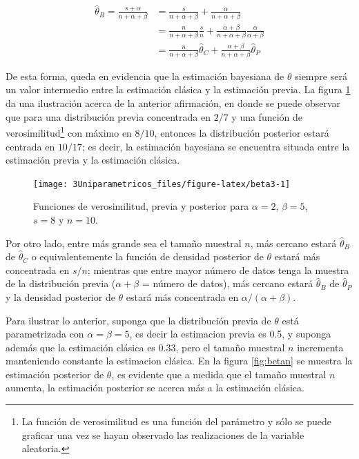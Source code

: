\documentclass[
  10pt,
  spanish,
]{book}
\theoremstyle{definition}
\theoremstyle{definition}
\theoremstyle{definition}
\theoremstyle{definition}
\theoremstyle{remark}
\begin{document}
\begin{align*}
\hat{\theta}_{B}=\frac{s+\alpha}{n+\alpha+\beta}&=\frac{s}{n+\alpha+\beta}+\frac{\alpha}{n+\alpha+\beta}\\
&=\frac{n}{n+\alpha+\beta}\frac{s}{n}+\frac{\alpha+\beta}{n+\alpha+\beta}\frac{\alpha}{\alpha+\beta}\\
&=\frac{n}{n+\alpha+\beta}\hat{\theta}_{C}+\frac{\alpha+\beta}{n+\alpha+\beta}\hat{\theta}_{P}
\end{align*}

De esta forma, queda en evidencia que la estimación bayesiana de
\(\theta\) siempre será un valor intermedio entre la estimación clásica y
la estimación previa. La figura \ref{fig:beta3} da una ilustración
acerca de la anterior afirmación, en donde se puede observar que para
una distribución previa concentrada en \(2/7\) y una función de
verosimilitud\footnote{La función de verosimilitud es una función del parámetro
  y sólo se puede graficar una vez se hayan observado las realizaciones de
  la variable aleatoria.} con máximo en \(8/10\), entonces la distribución
posterior estará centrada en \(10/17\); es decir, la estimación bayesiana
se encuentra situada entre la estimación previa y la estimación clásica.

\begin{figure}

{\centering \texttt{[image: 3Uniparametricos\_files/figure-latex/beta3-1]} 

}

\caption{Funciones de verosimilitud, previa y posterior para $\alpha=2$, $\beta=5$, $s=8$ y $n=10$.}\label{fig:beta3}
\end{figure}

Por otro lado, entre más grande sea el tamaño muestral \(n\), más
cercano estará \(\hat{\theta}_{B}\) de \(\hat{\theta}_{C}\) o
equivalentemente la función de densidad posterior de \(\theta\) estará más
concentrada en \(s/n\); mientras que entre mayor número de datos tenga la
muestra de la distribución previa (\(\alpha+\beta\) = número de datos), más
cercano estará \(\hat{\theta}_{B}\) de \(\hat{\theta}_{P}\) y la densidad
posterior de \(\theta\) estará más concentrada en \(\alpha/(\alpha+\beta)\).

Para ilustrar lo anterior, suponga que la distribución previa de
\(\theta\) está parametrizada con \(\alpha=\beta=5\), es decir la estimacion previa es 0.5, y suponga además que la estimación clásica es 0.33, pero el tamaño muestral \(n\) incrementa manteniendo constante la estimacion
clásica. En la figura \ref{fig:betan} se muestra la estimación posterior de
\(\theta\), es evidente que a medida que el tamaño muestral \(n\) aumenta,
la estimación posterior se acerca más a la estimación clásica.
\end{document}
